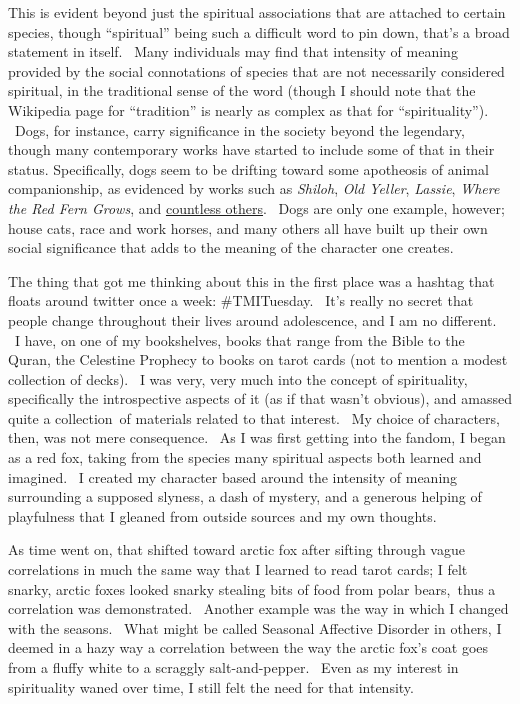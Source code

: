 This is evident beyond just the spiritual associations that are attached
to certain species, though ``spiritual'' being such a difficult word to
pin down, that's a broad statement in itself. ~Many individuals may find
that intensity of meaning provided by the social connotations of species
that are not necessarily considered spiritual, in the traditional sense
of the word (though I should note that the Wikipedia page for
``tradition'' is nearly as complex as that for ``spirituality''). ~Dogs,
for instance, carry significance in the society beyond the legendary,
though many contemporary works have started to include some of that in
their status. Specifically, dogs seem to be drifting toward some
apotheosis of animal companionship, as evidenced by works such as
\emph{Shiloh}, \emph{Old Yeller}, \emph{Lassie}, \emph{Where the Red
Fern Grows}, and
\href{http://www.abebooks.com/books/famous-dog-novels-lassie-marley/dogs-fiction.shtml}{countless
others}. ~Dogs are only one example, however; house cats, race and work
horses, and many others all have built up their own social significance
that adds to the meaning of the character one creates.

The thing that got me thinking about this in the first place was a
hashtag that floats around twitter once a week: \#TMITuesday. ~It's
really no secret that people change throughout their lives around
adolescence, and I am no different. ~I have, on one of my bookshelves,
books that range from the Bible to the Quran, the Celestine Prophecy to
books on tarot cards (not to mention a modest collection of decks). ~I
was very, very much into the concept of spirituality, specifically the
introspective aspects of it (as if that wasn't obvious), and amassed
quite a collection~of materials related to that interest. ~My choice of
characters, then, was not mere consequence. ~As I was first getting into
the fandom, I began as a red fox, taking from the species many spiritual
aspects both learned and imagined. ~I created my character based around
the intensity of meaning surrounding a supposed slyness, a dash of
mystery, and a generous helping of playfulness that I gleaned from
outside sources and my own thoughts.

As time went on, that shifted toward arctic fox after sifting through
vague correlations in much the same way that I learned to read tarot
cards; I felt snarky, arctic foxes looked snarky stealing bits of food
from polar bears,~thus a correlation was demonstrated. ~Another example
was the way in which I changed with the seasons. ~What might be called
Seasonal Affective Disorder in others, I deemed in a hazy way a
correlation between the way the arctic fox's coat goes from a fluffy
white to a scraggly salt-and-pepper. ~Even as my interest in
spirituality waned over time, I still felt the need for that intensity.

